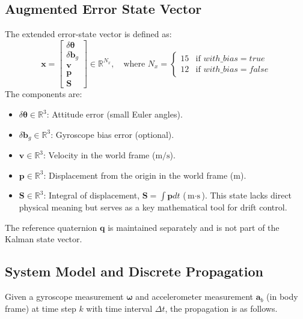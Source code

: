 \documentclass[11pt,letterpaper]{article}
\begin{document}
\subsection{Augmented Error State Vector}
The extended error-state vector is defined as:
\begin{equation}
\bm{x} = \begin{bmatrix}
\delta \bm{\theta} \\
\delta \bm{b}_g \\
\bm{v} \\
\bm{p} \\
\bm{S}
\end{bmatrix} \in \mathbb{R}^{N_x}, \quad \text{where } N_x = \begin{cases}
15 & \text{if } with\_bias = true \\
12 & \text{if } with\_bias = false
\end{cases}
\end{equation}
The components are:
\begin{itemize}
  \item $\delta \bm{\theta} \in \mathbb{R}^3$: Attitude error (small Euler angles).
  \item $\delta \bm{b}_g \in \mathbb{R}^3$: Gyroscope bias error (optional).
  \item $\bm{v} \in \mathbb{R}^3$: Velocity in the world frame ($\text{m/s}$).
  \item $\bm{p} \in \mathbb{R}^3$: Displacement from the origin in the world frame ($\text{m}$).
  \item $\bm{S} \in \mathbb{R}^3$: Integral of displacement, $\bm{S} = \int \bm{p}  dt$ ($\text{m}\cdot\text{s}$). This state lacks direct physical meaning but serves as a key mathematical tool for drift control.
\end{itemize}
The reference quaternion $\bm{q}$ is maintained separately and is not part of the Kalman state vector.

\subsection{System Model and Discrete Propagation}
\label{ssec:propagation}

Given a gyroscope measurement $\bm{\omega}$ and accelerometer measurement $\bm{a}_b$ (in body frame) at time step $k$ with time interval $\Delta t$, the propagation is as follows.
\end{document}
